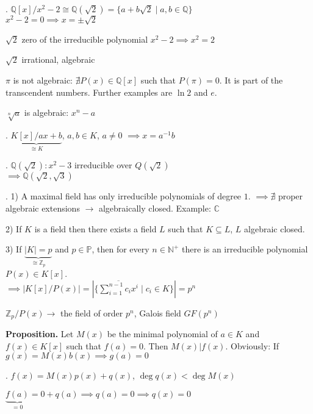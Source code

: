 \Example.
$\mathbb{Q}[x] / x^2 -2 \cong \mathbb{Q}(\sqrt{2}) = \{ a+b \sqrt{2} \mid a,b \in \mathbb{Q}\}$ \\
$x^2-2 = 0 \implies x = \pm \sqrt{2}$

$\sqrt{2}$ zero of the irreducible polynomial $x^2 -2 \implies x^2 = 2$

$\sqrt{2}$ irrational, algebraic

$\pi$ is not algebraic: $\nexists P(x) \in \mathbb{Q}[x]$ such that $P(\pi) = 0$. It is part of the transcendent numbers. Further examples are $\ln 2$ and $e$.

$\sqrt[n]{a}$ is algebraic: $x^n-a$

\Example.
$\underbrace{K[x]/ax+b}_{\cong K}$, $a,b \in K$, $ a\neq 0$ $\implies x = a^{-1}b$

\Example.
$\mathbb{Q}(\sqrt{2}): x^2 -3$ irreducible over $Q(\sqrt{2})$\\
$\implies \mathbb{Q}(\sqrt{2}, \sqrt{3})$

\Remark.
1) A maximal field has only irreducible polynomials of degree $1$. $\implies \nexists$ proper algebraic extensions $\rightarrow$ algebraically closed. Example: $\mathbb{C}$

2) If $K$ is a field then there exists a field $L$ such that $K \subseteq L$, $L$ algebraic closed.

3) If $\underbrace{|K| = p}_{\cong \mathbb{Z}_p}$ and $p\in \mathbb{P}$, then for every $n \in \mathbb{N}^{+}$ there is an irreducible polynomial $P(x) \in K[x]$. \\
$\implies \left| K[x]/P(x) \right| = \left| \{\overline{\sum_{i=1}^{n-1} c_i x^i} \mid c_i \in K\} \right| = p^n$

$\mathbb{Z}_p/P(x) \rightarrow$ the field of order $p^n$, Galois field $GF(p^n)$

\textbf{Proposition.}
Let $M(x)$ be the minimal polynomial of $a \in K$ and $f(x) \in K[x]$ such that $f(a) = 0$. Then $M(x)|f(x)$. Obviously: If $g(x) = M(x)b(x) \implies g(a) = 0$

\Proof.
$f(x) = M(x) p(x) + q(x)$, $\deg q(x) < \deg M(x)$

$\underbrace{f(a)}_{=0} = 0 + q(a) \implies q(a) = 0 \implies q(x) = 0$
